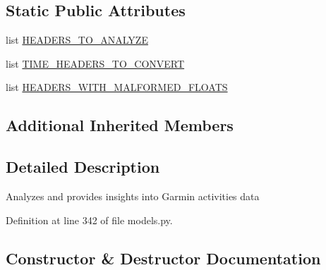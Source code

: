 \subsection*{Static Public Attributes}
\begin{DoxyCompactItemize}
\item 
list \hyperlink{classpygce_1_1analysis_1_1models_1_1_activities_data_analysis_a799ad90125cc686b985fe525a3b33062}{H\+E\+A\+D\+E\+R\+S\+\_\+\+T\+O\+\_\+\+A\+N\+A\+L\+Y\+ZE}
\item 
list \hyperlink{classpygce_1_1analysis_1_1models_1_1_activities_data_analysis_a2f0ccc7899b8c6b6d94391c80f5def1d}{T\+I\+M\+E\+\_\+\+H\+E\+A\+D\+E\+R\+S\+\_\+\+T\+O\+\_\+\+C\+O\+N\+V\+E\+RT}
\item 
list \hyperlink{classpygce_1_1analysis_1_1models_1_1_activities_data_analysis_a272e010f956a64a8f916ebf1b9e14255}{H\+E\+A\+D\+E\+R\+S\+\_\+\+W\+I\+T\+H\+\_\+\+M\+A\+L\+F\+O\+R\+M\+E\+D\+\_\+\+F\+L\+O\+A\+TS}
\end{DoxyCompactItemize}
\subsection*{Additional Inherited Members}


\subsection{Detailed Description}
\begin{DoxyVerb}Analyzes and provides insights into Garmin activities data \end{DoxyVerb}
 

Definition at line 342 of file models.\+py.



\subsection{Constructor \& Destructor Documentation}
